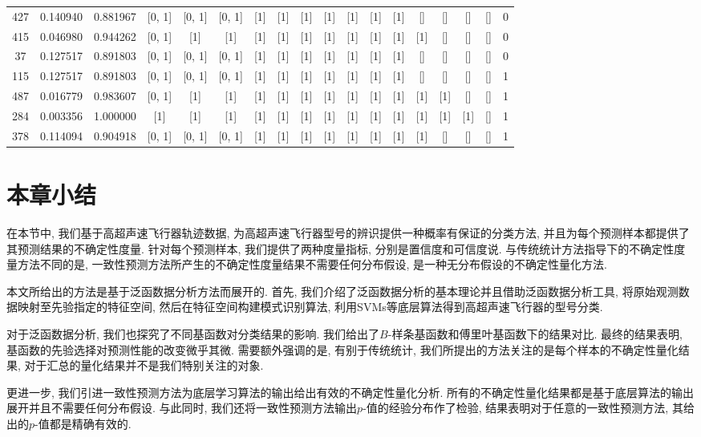\begin{landscape}
\begin{table}[]
\begin{tabular}{@{}cccccccccccccccccc@{}}
427	&0.140940	&0.881967	&[0, 1]	&[0, 1]	&[0, 1]	&[1]	&[1]	&[1]	&[1]	&[1]	&[1]	&[1]	&[]	&[]	&[]	&[]	&0 \\
415	&0.046980	&0.944262	&[0, 1]	&[1]	&[1]	&[1]	&[1]	&[1]	&[1]	&[1]	&[1]	&[1]	&[1]&[]	&[]	&[]	&0 \\
37	&0.127517	&0.891803	&[0, 1]	&[0, 1]	&[0, 1]	&[1]	&[1]	&[1]	&[1]	&[1]	&[1]	&[1]	&[]	&[]	&[]	&[]	&0 \\
115	&0.127517	&0.891803	&[0, 1]	&[0, 1]	&[0, 1]	&[1]	&[1]	&[1]	&[1]	&[1]	&[1]	&[1]	&[]	&[]	&[]	&[]	&1 \\
487 & 0.016779 & 0.983607 & {[}0, 1{]} & {[}1{]} & {[}1{]} & {[}1{]} & {[}1{]} & {[}1{]} & {[}1{]} & {[}1{]} & {[}1{]} & {[}1{]} & {[}1{]} & {[}1{]} & {[}{]} & {[}{]} & 1 \\
284 & 0.003356 & 1.000000 & {[}1{]} & {[}1{]} & {[}1{]} & {[}1{]} & {[}1{]} & {[}1{]} & {[}1{]} & {[}1{]} & {[}1{]} & {[}1{]} & {[}1{]} & {[}1{]} & {[}1{]} & {[}{]} & 1 \\
378 & 0.114094 & 0.904918 & {[}0, 1{]} & {[}0, 1{]} & {[}0, 1{]} & {[}1{]} & {[}1{]} & {[}1{]} & {[}1{]} & {[}1{]} & {[}1{]} & {[}1{]} & {[}1{]} & {[}{]} & {[}{]} & {[}{]} & 1 \\
\bottomrule
\end{tabular}
\end{table}
\end{landscape}


\section{本章小结}
\label{sec:conclusion}
在本节中, 我们基于高超声速飞行器轨迹数据, 为高超声速飞行器型号的辨识提供一种概率有保证的分类方法, 并且为每个预测样本都提供了其预测结果的不确定性度量. 针对每个预测样本, 我们提供了两种度量指标, 分别是置信度和可信度说. 与传统统计方法指导下的不确定性度量方法不同的是, 一致性预测方法所产生的不确定性度量结果不需要任何分布假设, 是一种无分布假设的不确定性量化方法. 

本文所给出的方法是基于泛函数据分析方法而展开的. 首先, 我们介绍了泛函数据分析的基本理论并且借助泛函数据分析工具, 将原始观测数据映射至先验指定的特征空间, 然后在特征空间构建模式识别算法, 利用SVMs等底层算法得到高超声速飞行器的型号分类. 

对于泛函数据分析, 我们也探究了不同基函数对分类结果的影响. 我们给出了$B$-样条基函数和傅里叶基函数下的结果对比. 最终的结果表明, 基函数的先验选择对预测性能的改变微乎其微. 需要额外强调的是, 有别于传统统计, 我们所提出的方法关注的是每个样本的不确定性量化结果, 对于汇总的量化结果并不是我们特别关注的对象.

更进一步, 我们引进一致性预测方法为底层学习算法的输出给出有效的不确定性量化分析. 所有的不确定性量化结果都是基于底层算法的输出展开并且不需要任何分布假设. 与此同时, 我们还将一致性预测方法输出$p$-值的经验分布作了检验, 结果表明对于任意的一致性预测方法, 其给出的$p$-值都是精确有效的.